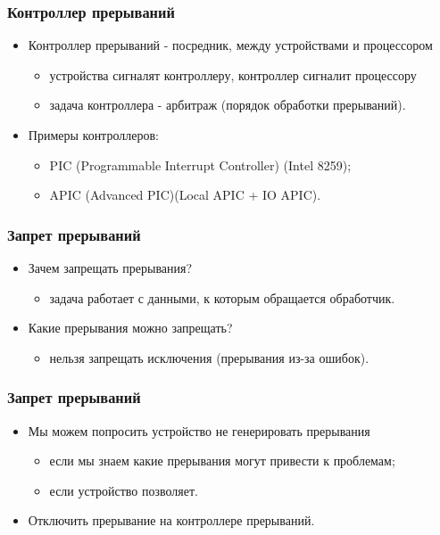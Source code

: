 \begin{frame}
\frametitle{Контроллер прерываний}
\begin{itemize}
    \item<1->Контроллер прерываний - посредник, между устройствами и процессором
    \begin{itemize}
        \item<2->устройства сигналят контроллеру, контроллер сигналит процессору
        \item<3->задача контроллера - арбитраж (порядок обработки прерываний).
    \end{itemize}
    \item<4->Примеры контроллеров:
    \begin{itemize}
        \item PIC (Programmable Interrupt Controller) (Intel 8259);
        \item APIC (Advanced PIC)(Local APIC + IO APIC).
    \end{itemize}
\end{itemize}
\end{frame}

\begin{frame}
\frametitle{Запрет прерываний}
\begin{itemize}
    \item<1->Зачем запрещать прерывания?
    \begin{itemize}
        \item задача работает с данными, к которым обращается обработчик.
    \end{itemize}
    \item<2->Какие прерывания можно запрещать?
    \begin{itemize}
        \item нельзя запрещать исключения (прерывания из-за ошибок).
    \end{itemize}
\end{itemize}
\end{frame}

\begin{frame}
\frametitle{Запрет прерываний}
\begin{itemize}
    \item<1->Мы можем попросить устройство не генерировать прерывания
    \begin{itemize}
        \item если мы знаем какие прерывания могут привести к проблемам;
        \item если устройство позволяет.
    \end{itemize}
    \item<2->Отключить прерывание на контроллере прерываний.
\end{itemize}
\end{frame}

